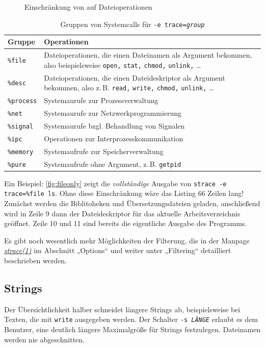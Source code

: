 \begin{figure}[tb]
  
  \caption{Einschränkung von \strace{} auf Dateioperationen}
  \label{fig:fileonly}
\end{figure}


\begin{table}[htb]
  \centering\small
  \begin{tabular}{|lp{6cm}|}
    \hline
    \textbf{Gruppe} & \textbf{Operationen} \\
    \hline
    \texttt{\%file}          & Dateioperationen, die einen Dateinamen als Argument
                               bekommen, also beispielsweise \texttt{open,} \texttt{stat,}
                               \texttt{chmod,} \texttt{unlink,} … \\
    \texttt{\%desc}          & Dateioperationen, die einen Dateideskriptor als Argument
                               bekommen, also z.\,B. \texttt{read,} \texttt{write,}
                               \texttt{chmod,} \texttt{unlink,} … \\
    \texttt{\%process}       & Systemaurufe zur Prozessverwaltung \\
    \texttt{\%net}           & Systemaurufe zur Netzwerkprogrammierung \\
    \texttt{\%signal}        & Systemaurufe bzgl. Behandlung von Signalen \\
    \texttt{\%ipc}           & Operationen zur Interprozesskommunikation \\
    \texttt{\%memory}        & Systemaufrufe zur Speicherverwaltung \\
    \texttt{\%pure}          & Systemaufrufe ohne Argument, z.\,B. \texttt{getpid} \\
    \hline
  \end{tabular}
  \caption{Gruppen von Systemcalls für \texttt{-e trace=\emph{group}}}
  \label{tab:strace_groups}
\end{table}

Ein Beispiel: \autoref{fig:fileonly} zeigt die \emph{vollständige} Ausgabe von \texttt{strace -e 
trace=\%file ls}. Ohne diese Einschränkung wäre das Listing 66 Zeilen lang! Zunächst werden
die Biblitoheken und Übersetzungsdateien geladen, anschließend wird in Zeile 9 dann der
Dateideskriptor für das aktuelle Arbeitsverzeichnis geöffnet. Zeile 10 und 11 sind bereits
die eigentliche Ausgabe des Programms.

Es gibt noch wesentlich mehr Möglichkeiten der Filterung, die in der Manpage
\href{http://man7.org/linux/man-pages/man1/strace.1.html#OPTIONS}{\emph{strace(1)}} im Abschnitt
„Options“ und weiter unter „Filtering“ detailliert beschrieben werden.

\subsection{Strings}

Der Übersichtlichkeit halber schneidet \strace{} längere Strings ab, beispielsweise bei Texten, die
mit \texttt{write} ausgegeben werden. Der Schalter \texttt{-s \emph{LÄNGE}} erlaubt es dem
Benutzer, eine deutlich längere Maximalgröße für Strings festzulegen. Dateinamen werden nie
abgeschnitten.